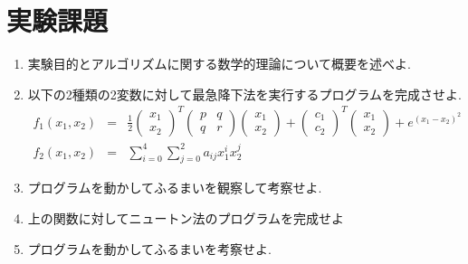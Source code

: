 \documentclass[12pt]{jarticle}
\begin{document}
\section{実験課題}
\begin{enumerate}
    \item 実験目的とアルゴリズムに関する数学的理論について概要を述べよ.
    \item 以下の2種類の2変数に対して最急降下法を実行するプログラムを完成させよ.
          \begin{eqnarray}
              f_1(x_1,x_2)&=&\frac{1}{2}
              \left(\begin{array}{r}
                      x_1 \\
                      x_2
                  \end{array}\right)^T\left(\begin{array}{rr}
                      p & q \\
                      q & r
                  \end{array}\right)\left(\begin{array}{r}
                      x_1 \\
                      x_2
                  \end{array}\right)+\left(\begin{array}{r}
                      c_1 \\
                      c_2
                  \end{array}\right)^T\left(\begin{array}{r}
                      x_1 \\
                      x_2
                  \end{array}\right)+e^{(x_1-x_2)^2}\nonumber\\
              f_2(x_1,x_2)&=&\sum^4_{i=0}\sum^2_{j=0}a_{ij}x^i_1x^j_2\nonumber
          \end{eqnarray}
    \item プログラムを動かしてふるまいを観察して考察せよ.
    \item 上の関数に対してニュートン法のプログラムを完成せよ
    \item プログラムを動かしてふるまいを考察せよ.
\end{enumerate}
\end{document}
